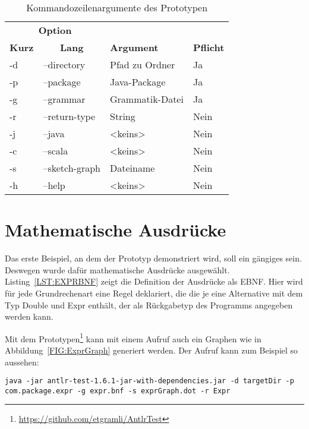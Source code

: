 \documentclass[../InterneDSLs.tex]{subfiles}
\begin{document}
\begin{table}[ht]
\centering
\begin{tabular}{llll}
\multicolumn{2}{c|}{\textbf{Option}} & & \\
\textbf{Kurz} & \multicolumn{1}{c|}{\textbf{Lang}} & \textbf{Argument} & \textbf{Pflicht}\\\hline
-d & --directory    & Pfad zu Ordner  & Ja\\
-p & --package      & Java-Package    & Ja\\
-g & --grammar      & Grammatik-Datei & Ja\\
-r & --return-type  & String          & Nein\\
-j & --java         & <keins>         & Nein\\
-c & --scala        & <keins>         & Nein\\
-s & --sketch-graph & Dateiname       & Nein\\
-h & --help         & <keins>         & Nein\\
\end{tabular}
\caption{Kommandozeilenargumente des Prototypen}
\label{TAB:PrototypeCMD}
\end{table}

\section{Mathematische Ausdrücke}
Das erste Beispiel, an dem der Prototyp demonstriert wird, soll ein gängiges sein. Deswegen wurde dafür mathematische Ausdrücke ausgewählt. Listing~\ref{LST:EXPRBNF} zeigt die Definition der Ausdrücke als EBNF. Hier wird für jede Grundrechenart eine Regel deklariert, die die je eine Alternative mit dem Typ Double und Expr enthält, der als Rückgabetyp des Programms angegeben werden kann.

Mit dem Prototypen\footnote{\url{https://github.com/etgramli/AntlrTest}} kann mit einem Aufruf auch ein Graphen wie in Abbildung~\ref{FIG:ExprGraph} generiert werden. Der Aufruf kann zum Beispiel so aussehen:
\begin{lstlisting}
java -jar antlr-test-1.6.1-jar-with-dependencies.jar -d targetDir -p com.package.expr -g expr.bnf -s exprGraph.dot -r Expr
\end{lstlisting}

\begin{figure}

\end{figure}
\end{document}

